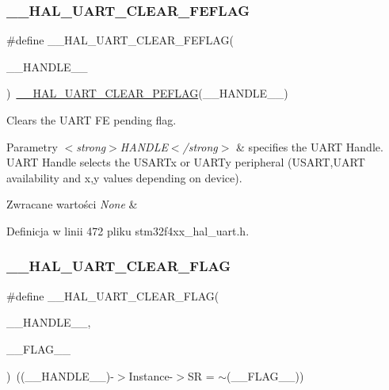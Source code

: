 \subsubsection{\texorpdfstring{\+\_\+\+\_\+\+H\+A\+L\+\_\+\+U\+A\+R\+T\+\_\+\+C\+L\+E\+A\+R\+\_\+\+F\+E\+F\+L\+AG}{\_\_HAL\_UART\_CLEAR\_FEFLAG}}
{\footnotesize\ttfamily \#define \+\_\+\+\_\+\+H\+A\+L\+\_\+\+U\+A\+R\+T\+\_\+\+C\+L\+E\+A\+R\+\_\+\+F\+E\+F\+L\+AG(\begin{DoxyParamCaption}\item[{}]{\+\_\+\+\_\+\+H\+A\+N\+D\+L\+E\+\_\+\+\_\+ }\end{DoxyParamCaption})~\hyperlink{group___u_a_r_t___exported___macros_gaba5e19c60e0f37341b1585a380b84d49}{\+\_\+\+\_\+\+H\+A\+L\+\_\+\+U\+A\+R\+T\+\_\+\+C\+L\+E\+A\+R\+\_\+\+P\+E\+F\+L\+AG}(\+\_\+\+\_\+\+H\+A\+N\+D\+L\+E\+\_\+\+\_\+)}



Clears the U\+A\+RT FE pending flag. 


\begin{DoxyParams}{Parametry}
{\em $<$strong$>$\+H\+A\+N\+D\+L\+E$<$/strong$>$} & specifies the U\+A\+RT Handle. U\+A\+RT Handle selects the U\+S\+A\+R\+Tx or U\+A\+R\+Ty peripheral (U\+S\+A\+RT,U\+A\+RT availability and x,y values depending on device). \\
\hline
\end{DoxyParams}

\begin{DoxyRetVals}{Zwracane wartości}
{\em None} & \\
\hline
\end{DoxyRetVals}


Definicja w linii 472 pliku stm32f4xx\+\_\+hal\+\_\+uart.\+h.

\mbox{\label{group___u_a_r_t___exported___macros_ga9bd035161d41cde4f2568c7af06493bf}} 
\subsubsection{\texorpdfstring{\+\_\+\+\_\+\+H\+A\+L\+\_\+\+U\+A\+R\+T\+\_\+\+C\+L\+E\+A\+R\+\_\+\+F\+L\+AG}{\_\_HAL\_UART\_CLEAR\_FLAG}}
{\footnotesize\ttfamily \#define \+\_\+\+\_\+\+H\+A\+L\+\_\+\+U\+A\+R\+T\+\_\+\+C\+L\+E\+A\+R\+\_\+\+F\+L\+AG(\begin{DoxyParamCaption}\item[{}]{\+\_\+\+\_\+\+H\+A\+N\+D\+L\+E\+\_\+\+\_\+,  }\item[{}]{\+\_\+\+\_\+\+F\+L\+A\+G\+\_\+\+\_\+ }\end{DoxyParamCaption})~((\+\_\+\+\_\+\+H\+A\+N\+D\+L\+E\+\_\+\+\_\+)-\/$>$Instance-\/$>$SR = $\sim$(\+\_\+\+\_\+\+F\+L\+A\+G\+\_\+\+\_\+))}



